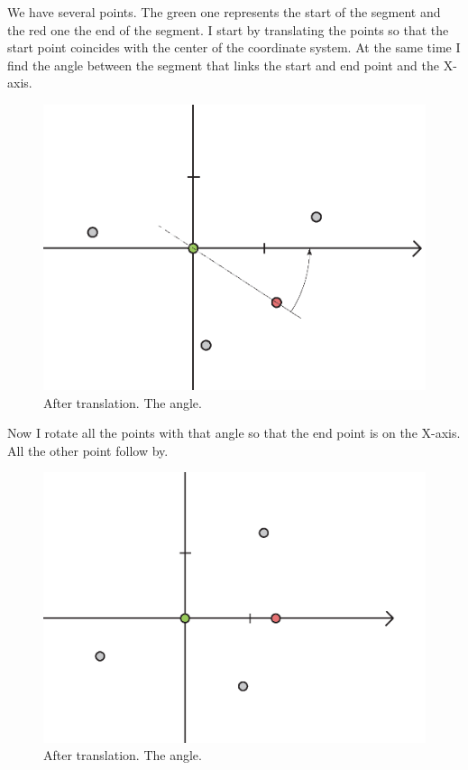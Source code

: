             \FloatBarrier

            We have several points. 
            The green one represents the start of the segment and the red one the end of the segment.
            I start by translating the points so that the start point coincides with the center of the coordinate system.
            At the same time I find the angle between the segment that links the start and end point and the X-axis.

            \begin{figure}[ht]
                \centering
                \caption{After translation. The angle.}
                \includegraphics[scale=0.6]{img/explain02.png}
            \end{figure}

            \FloatBarrier

            Now I rotate all the points with that angle so that the end point is on the X-axis.
            All the other point follow by.

            \begin{figure}[ht]
                \centering
                \caption{After translation. The angle.}
                \includegraphics[scale=0.6]{img/explain04.png}
            \end{figure}

